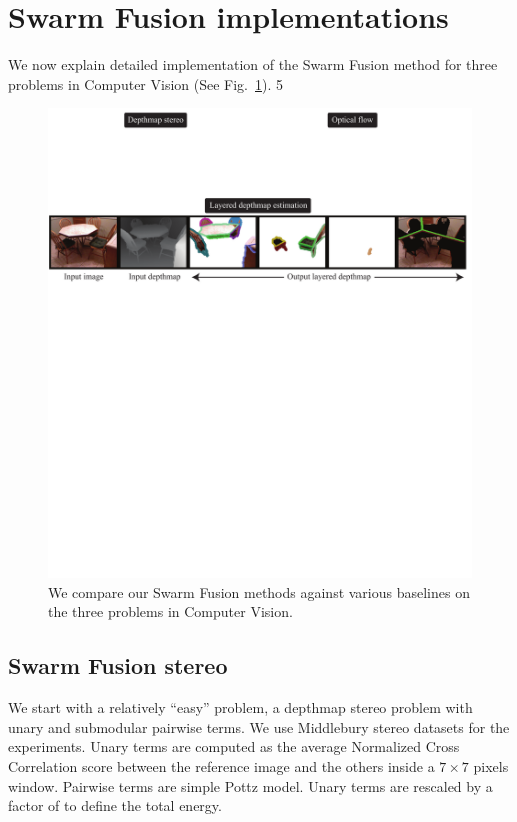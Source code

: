 \section{Swarm Fusion implementations} 
We now explain detailed implementation of the Swarm Fusion method for
three problems in Computer Vision (See Fig.~\ref{fig:problem}).
5
\begin{figure}[tb]
 \includegraphics[width=\columnwidth]{figure/problem.pdf}
 \caption{We compare our Swarm Fusion methods against various baselines
 on the three problems in Computer Vision.}\label{fig:problem}
\end{figure}



\subsection{Swarm Fusion stereo}
We start with a relatively ``easy'' problem, a depthmap stereo problem
with unary and submodular pairwise terms.
%
We use Middlebury stereo datasets for the experiments. Unary terms are
computed as the average Normalized Cross Correlation score between the
reference image and the others inside a $7\times 7$ pixels
window. Pairwise terms are simple Pottz model. Unary terms are rescaled
by a factor of  to define the total energy.



